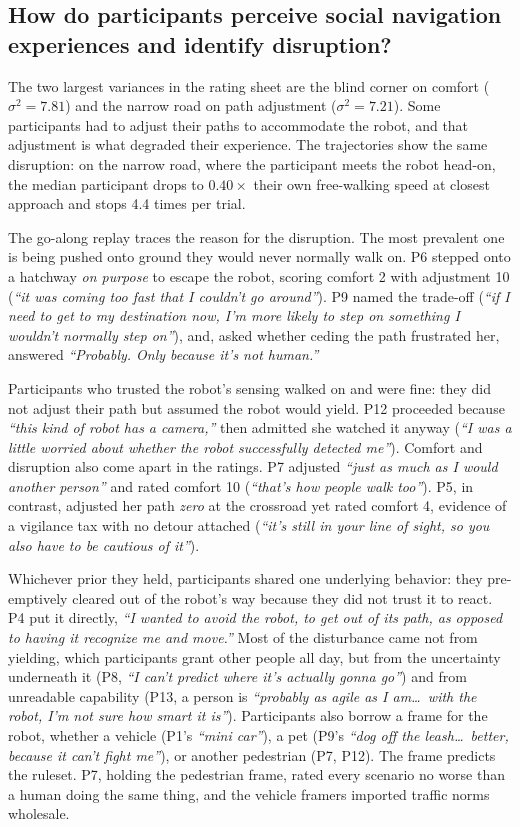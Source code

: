 \subsection{How do participants perceive social navigation experiences and identify disruption?}
The two largest variances in the rating sheet are the blind corner on comfort ($\sigma^2{=}7.81$) and the narrow road on path adjustment ($\sigma^2{=}7.21$). Some participants had to adjust their paths to accommodate the robot, and that adjustment is what degraded their experience. The trajectories show the same disruption: on the narrow road, where the participant meets the robot head-on, the median participant drops to $0.40\times$ their own free-walking speed at closest approach and stops 4.4 times per trial.

The go-along replay traces the reason for the disruption. The most prevalent one is being pushed onto ground they would never normally walk on. P6 stepped onto a hatchway \emph{on purpose} to escape the robot, scoring comfort 2 with adjustment 10 (\emph{``it was coming too fast that I couldn't go around''}). P9 named the trade-off (\emph{``if I need to get to my destination now, I'm more likely to step on something I wouldn't normally step on''}), and, asked whether ceding the path frustrated her, answered \emph{``Probably. Only because it's not human.''}

Participants who trusted the robot's sensing walked on and were fine: they did not adjust their path but assumed the robot would yield. P12 proceeded because \emph{``this kind of robot has a camera,''} then admitted she watched it anyway (\emph{``I was a little worried about whether the robot successfully detected me''}). Comfort and disruption also come apart in the ratings. P7 adjusted \emph{``just as much as I would another person''} and rated comfort 10 (\emph{``that's how people walk too''}). P5, in contrast, adjusted her path \emph{zero} at the crossroad yet rated comfort 4, evidence of a vigilance tax with no detour attached (\emph{``it's still in your line of sight, so you also have to be cautious of it''}).

Whichever prior they held, participants shared one underlying behavior: they pre-emptively cleared out of the robot's way because they did not trust it to react. P4 put it directly, \emph{``I wanted to avoid the robot, to get out of its path, as opposed to having it recognize me and move.''} Most of the disturbance came not from yielding, which participants grant other people all day, but from the uncertainty underneath it (P8, \emph{``I can't predict where it's actually gonna go''}) and from unreadable capability (P13, a person is \emph{``probably as agile as I am\dots\ with the robot, I'm not sure how smart it is''}). Participants also borrow a frame for the robot, whether a vehicle (P1's \emph{``mini car''}), a pet (P9's \emph{``dog off the leash\dots\ better, because it can't fight me''}), or another pedestrian (P7, P12). The frame predicts the ruleset. P7, holding the pedestrian frame, rated every scenario no worse than a human doing the same thing, and the vehicle framers imported traffic norms wholesale.

